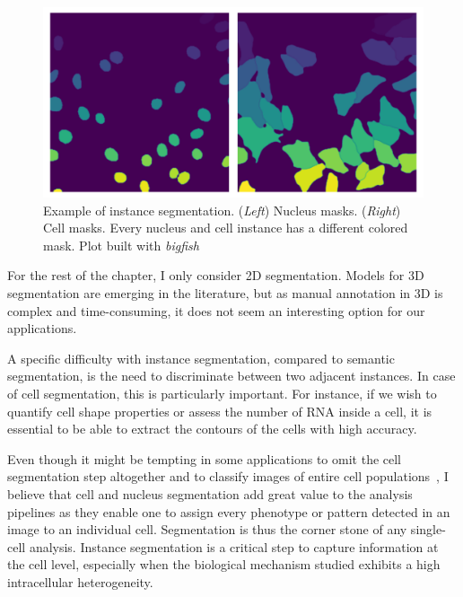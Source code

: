 \begin{figure}[]
    \centering
    \includegraphics[width=\textwidth]{figures/chapter3/instance_segmentation}
    \caption[Example of instance segmentation]{Example of instance segmentation.
	(\textit{Left}) Nucleus masks.
	(\textit{Right}) Cell masks.
	Every nucleus and cell instance has a different colored mask.
	Plot built with \emph{bigfish}}
    \label{fig:instance_segmentation_example}
\end{figure}

For the rest of the chapter, I only consider 2D segmentation.
Models for 3D segmentation are emerging in the literature, but as manual annotation in 3D is complex and time-consuming, it does not seem an interesting option for our applications. 



A specific difficulty with instance segmentation, compared to semantic segmentation, is the need to discriminate between two adjacent instances.
In case of cell segmentation, this is particularly important. For instance, if we wish to quantify cell shape properties or assess the number of \ac{RNA} inside a cell, it is essential to be able to extract the contours of the cells with high accuracy. 


Even though it might be tempting in some applications to omit the cell segmentation step altogether and to classify images of entire cell populations~\cite{Godinez2017}, I believe that cell and nucleus segmentation add great value to the analysis pipelines as they enable one to assign every phenotype or pattern detected in an image to an individual cell. Segmentation is thus the corner stone of any single-cell analysis.
Instance segmentation is a critical step to capture information at the cell level, especially when the biological mechanism studied exhibits a high intracellular heterogeneity.

